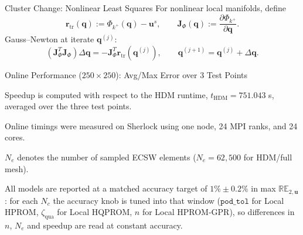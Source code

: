 \documentclass[aspectratio=169]{beamer}
\begin{document}
{\begin{frame}{Cluster Change: Nonlinear Least Squares}
\small
For nonlinear local manifolds, define
\[
\mathbf r_{\mathrm{tr}}(\mathbf q):=\Phi_{k^+}(\mathbf q)-\mathbf u^s,
\qquad
\mathbf J_{\Phi}(\mathbf q):=\frac{\partial \Phi_{k^+}}{\partial \mathbf q}.
\]
Gauss--Newton at iterate $\mathbf q^{(j)}$:
\[
\left(\mathbf J_{\Phi}^T\mathbf J_{\Phi}\right)\Delta\mathbf q
=
-\mathbf J_{\Phi}^T\mathbf r_{\mathrm{tr}}(\mathbf q^{(j)}),
\qquad
\mathbf q^{(j+1)}=\mathbf q^{(j)}+\Delta\mathbf q.
\]
\end{frame}

}

\begin{frame}{Online Performance ($250\times250$): Avg/Max Error over 3 Test Points}
\scriptsize
\centering
{}
\vspace{0.2em}

{\tiny Speedup is computed with respect to the HDM runtime, $t_{\mathrm{HDM}}=751.043$ s, averaged over the three test points.}

{\tiny Online timings were measured on Sherlock using one node, 24 MPI ranks, and 24 cores.}

{\tiny $N_e$ denotes the number of sampled ECSW elements ($N_e=62{,}500$ for HDM/full mesh).}

{\tiny All models are reported at a matched accuracy target of $1\% \pm 0.2\%$ in max $\mathbb{RE}_{2,\mathbf{u}}$: for each $N_c$ the accuracy knob is tuned into that window ($\mathtt{pod\_tol}$ for Local HPROM, $\zeta_{\mathrm{qua}}$ for Local HQPROM, $n$ for Local HPROM-GPR), so differences in $n$, $N_e$ and speedup are read at constant accuracy.}
\end{frame}
\end{document}
